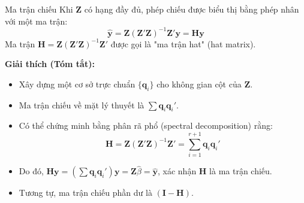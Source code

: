 \begin{frame}{Ma trận chiếu}
    Khi $\mathbf{Z}$ có hạng đầy đủ, phép chiếu được biểu thị bằng phép nhân với một ma trận:
    \[
    \hat{\mathbf{y}} = \mathbf{Z}(\mathbf{Z}'\mathbf{Z})^{-1}\mathbf{Z}'\mathbf{y} = \mathbf{H}\mathbf{y}
    \]
    Ma trận $\mathbf{H} = \mathbf{Z}(\mathbf{Z}'\mathbf{Z})^{-1}\mathbf{Z}'$ được gọi là "ma trận hat" (hat matrix).

    \vspace{0.5em}
    \pause
    \textbf{Giải thích (Tóm tắt):}
    \begin{itemize}
        \item Xây dựng một cơ sở trực chuẩn $\{\mathbf{q}_i\}$ cho không gian cột của $\mathbf{Z}$.
        \item Ma trận chiếu về mặt lý thuyết là $\sum \mathbf{q}_i \mathbf{q}_i'$.
        \item Có thể chứng minh bằng phân rã phổ (spectral decomposition) rằng:
        \[
        \mathbf{H} = \mathbf{Z}(\mathbf{Z}'\mathbf{Z})^{-1}\mathbf{Z}' = \sum_{i=1}^{r+1} \mathbf{q}_i \mathbf{q}_i'
        \]
        
        \item Do đó, $\mathbf{H}\mathbf{y} = (\sum \mathbf{q}_i \mathbf{q}_i')\mathbf{y} = \mathbf{Z}\hat{\beta} = \hat{\mathbf{y}}$, xác nhận $\mathbf{H}$ là ma trận chiếu.
        \item Tương tự, ma trận chiếu phần dư là $(\mathbf{I} - \mathbf{H})$.
    \end{itemize}
\end{frame}

